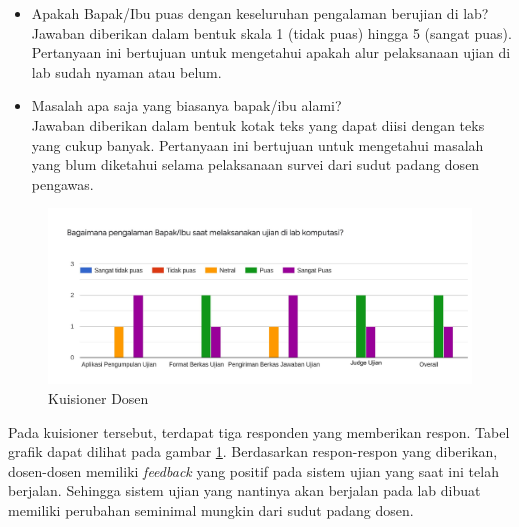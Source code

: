\begin{itemize}
        \item Apakah Bapak/Ibu puas dengan keseluruhan pengalaman berujian di
        lab? \\
            Jawaban diberikan dalam bentuk skala 1 (tidak puas) hingga 5 (sangat
            puas). Pertanyaan ini bertujuan untuk mengetahui apakah alur
            pelaksanaan ujian di lab sudah nyaman atau belum.
            
        \item Masalah apa saja yang biasanya bapak/ibu alami? \\
            Jawaban diberikan dalam bentuk kotak teks yang dapat diisi dengan
            teks yang cukup banyak. Pertanyaan ini bertujuan untuk mengetahui
            masalah yang blum diketahui selama pelaksanaan survei dari sudut
            padang dosen pengawas.
    \end{itemize}
    
    \begin{figure}
        \centering
        \includegraphics[width=0.6\paperwidth]{Gambar/survey-dosen.pdf}
        \caption{Kuisioner Dosen}
        \label{fig:kuisioner-dosen}
    \end{figure}
    
    Pada kuisioner tersebut, terdapat tiga responden yang memberikan respon.
    Tabel grafik dapat dilihat pada gambar \ref{fig:kuisioner-dosen}.
    Berdasarkan respon-respon yang diberikan, dosen-dosen memiliki
    \textit{feedback} yang positif pada sistem ujian yang saat ini telah
    berjalan. Sehingga sistem ujian yang nantinya akan berjalan pada lab dibuat
    memiliki perubahan seminimal mungkin dari sudut padang dosen.
    
